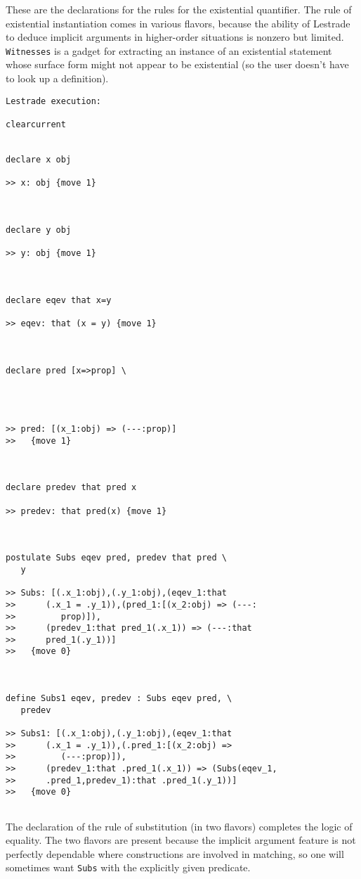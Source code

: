 \documentclass[12pt]{article}
\begin{document}
These are the declarations for the rules for the existential quantifier.  The rule of existential instantiation comes in various flavors, because the ability of
Lestrade to deduce implicit arguments in higher-order situations is nonzero but limited.  {\tt Witnesses} is a gadget for extracting an instance of an existential statement whose
surface form might not appear to be existential (so the user doesn't have to look up a definition).

\begin{verbatim}Lestrade execution:

clearcurrent


declare x obj

>> x: obj {move 1}



declare y obj

>> y: obj {move 1}



declare eqev that x=y

>> eqev: that (x = y) {move 1}



declare pred [x=>prop] \
   



>> pred: [(x_1:obj) => (---:prop)]
>>   {move 1}



declare predev that pred x

>> predev: that pred(x) {move 1}



postulate Subs eqev pred, predev that pred \
   y

>> Subs: [(.x_1:obj),(.y_1:obj),(eqev_1:that
>>      (.x_1 = .y_1)),(pred_1:[(x_2:obj) => (---:
>>         prop)]),
>>      (predev_1:that pred_1(.x_1)) => (---:that
>>      pred_1(.y_1))]
>>   {move 0}



define Subs1 eqev, predev : Subs eqev pred, \
   predev

>> Subs1: [(.x_1:obj),(.y_1:obj),(eqev_1:that
>>      (.x_1 = .y_1)),(.pred_1:[(x_2:obj) =>
>>         (---:prop)]),
>>      (predev_1:that .pred_1(.x_1)) => (Subs(eqev_1,
>>      .pred_1,predev_1):that .pred_1(.y_1))]
>>   {move 0}


\end{verbatim}

The declaration of the rule of substitution (in two flavors) completes the logic of equality.  The two flavors are present because the implicit argument feature is not perfectly dependable where constructions are involved in matching, so one will sometimes want {\tt Subs} with the explicitly given predicate.
\end{document}
